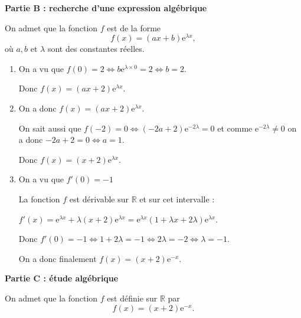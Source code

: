 \documentclass[10pt]{article}
\providecommand{\R}{\mathbb{R}}
\providecommand{\e}{{\mathrm{e}}}
\begin{document}
\medskip

\begin{center}\textbf{Partie B :  recherche d'une expression algébrique}\end{center}

On admet que la fonction $f$ est de la forme 
\[f(x)= (ax + b)\e^{\lambda x},\]
où $a, b$ et $\lambda$ sont des constantes réelles.



\medskip

\begin{enumerate}
\item 
On a vu que $f(0) = 2 \iff b\e^{\lambda \times 0} = 2 \iff b = 2$.

Donc $f(x) = (ax + 2)\e^{\lambda x}$.
\item 

On a donc $f(x) = (ax + 2)\e^{\lambda x}$.

On sait aussi que $f(-2) = 0 \iff (-2a + 2)\e^{-2\lambda } = 0$ et comme $\e^{-2\lambda }  \ne 0$ on a donc $-2a + 2 = 0 \iff a = 1$.

Donc $f(x) = (x + 2)\e^{\lambda x}$.
\item 
On a vu que $f'(0) = - 1$

La fonction $f$ est dérivable sur $\R$ et sur cet intervalle :

$f'(x) = \e^{\lambda x} + \lambda (x + 2)\e^{\lambda x} = \e^{\lambda x}(1 + \lambda x + 2\lambda )\e^{\lambda x}$.

Donc $f'(0) = - 1 \iff 1  + 2\lambda = - 1 \iff 2\lambda  = - 2 \iff \lambda = - 1 $.

On a donc finalement $f(x) = (x + 2)\e^{- x}$.
\end{enumerate}

\medskip

\begin{center}\textbf{Partie C : étude algébrique}\end{center}

On admet que la fonction $f$ est définie sur $\R$ par 
\[f(x) = (x + 2)\e^{-x}.\]

\smallskip
\end{document}
